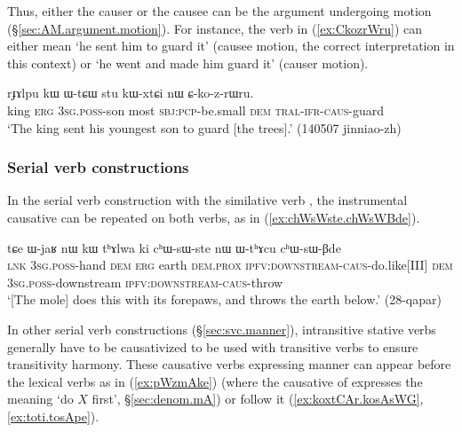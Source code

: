 Thus, either the causer or the causee can be the argument undergoing motion (§\ref{sec:AM.argument.motion}). For instance, the verb  in (\ref{ex:CkozrWru}) can either mean `he sent him to guard it' (causee motion, the correct interpretation in this context) or `he went and made him guard it' (causer motion).

\begin{exe}
\ex \label{ex:CkozrWru}
\gll rɟɤlpu kɯ ɯ-tɕɯ stu kɯ-xtɕi nɯ ɕ-ko-z-rɯru. \\
king \textsc{erg} \textsc{3sg}.\textsc{poss}-son most \textsc{sbj}:\textsc{pcp}-be.small \textsc{dem} \textsc{tral}-\textsc{ifr}-\textsc{caus}-guard \\
\glt `The king sent his youngest son to guard [the trees].' (140507 jinniao-zh)
\end{exe}

 
 
\subsubsection{Serial verb constructions} \label{sec:sig.caus.serial}
 
In the serial verb construction with the similative verb , the instrumental causative can be repeated on both verbs, as in (\ref{ex:chWsWste.chWsWBde}).

\begin{exe}
\ex \label{ex:chWsWste.chWsWBde}
\gll  tɕe ɯ-jaʁ nɯ kɯ tʰɤlwa ki cʰɯ-sɯ-ste nɯ ɯ-tʰɤcu cʰɯ-sɯ-βde \\
\textsc{lnk} \textsc{3sg}.\textsc{poss}-hand \textsc{dem} \textsc{erg} earth \textsc{dem}.\textsc{prox} \textsc{ipfv}:\textsc{downstream}-\textsc{caus}-do.like[III] \textsc{dem} \textsc{3sg}.\textsc{poss}-downstream \textsc{ipfv}:\textsc{downstream}-\textsc{caus}-throw \\
\glt `[The mole] does this with its forepaws, and throws the earth below.' (28-qapar)
\end{exe}

In other serial verb constructions (§\ref{sec:svc.manner}), intransitive stative verbs generally have to be causativized to be used with transitive verbs to ensure transitivity harmony. These causative verbs expressing manner can appear before the lexical verbs as in (\ref{ex:pWzmAke}) (where the causative of  expresses the meaning `do $X$ first', §\ref{sec:denom.mA}) or follow it (\ref{ex:koxtCAr.kosAsWG}, \ref{ex:toti.tosApe}).

